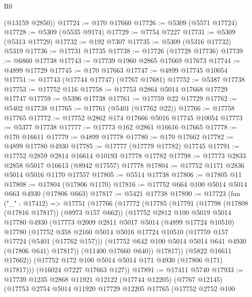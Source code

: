 \begin{lexlean}{R0}
\begin{coremodule}
      (@13159 @2850))
@17724 := @170 @17660
@17726 := @5309 (@5571 @17724)
@17728 := @5309 (@5535 @9174)
@17729 := @7754 @7227
@17731 := @5309 (@5313 @17729)
@17732 := @192 @7307
@17735 := @5309 (@5316 @17732) @5319
@17736 := @17731 @17735
@17738 := @17726 (@17728 @17736)
@17739 := @6860 @17738
@17743 := @17739 @1960 @2865 @17669 @17673
@17744 := @4899 @17729
@17745 := @170 @17663
@17747 := @4899 @17745 @10054
@17751 := @17743 (@17744 @17747) (@7767 @17681)
@17752 := @5387 @17738
@17753 := @17752 @116
@17758 := @17753 @2864 @5014 @17668 @17729 @17747
@17759 := @5396 @17738
@17761 := @17759 @22 @17729
@17762 := @5402 @17738
@17765 := @17761 (@5401 (@17762 @22))
@17766 := @17758 @17765
@17772 := @17752 @2862 @174 @17666 @5016 @17745 @10054
@17773 := @5377 @17738
@17777 := @17773 @162 @2861 @16616 @17665
@17778 := @170 @16611
@17779 := @4899 @17778
@17780 := @170 @17662
@17782 := @4899 @17780 @4930
@17785 := @17777 (@17779 @17782) @17745
@17791 := @17752 @2859 @2814 @16614 @10193 @17778 @17782
@17798 := @17773 @2833 @2858 @5017 @16613 (@8942 @17557) @17778
@17804 := @17752 @1171 @2836 @5014 @5016 @1170 @17557
@17805 := @5514 @17738
@17806 := @17805 @11
@17808 := @17804 (@17806 @1170)
@17816 := @17752 @664 @100 @5014 @5014 @663 @4930 (@17806 @663)
@17817 := @5421 @17738
@17890 := @17723
    (fun ("_" : @17412) =>
    @17751
      (@17766
        (@17772
          (@17785
            (@17791
              (@17798 (@17808 (@17816 @17817)) (@8973 @157 @662))
              (@17752
                @2812
                @100
                @5019
                @5014
                @17780
                @4930
                (@17773
                  @2009
                  @2811
                  @5017
                  @5014
                  (@4899 @17724 @10510)
                  @17780
                  (@17752
                    @358
                    @2160
                    @5014
                    @5016
                    @17724
                    @10510
                    (@17759 @157 @17724 (@5401 (@17762 @157)))
                    (@17752 @642 @100 @5014 @5014 @641 @4930 (@17806 @641) @17817))
                  (@11400 @17660 @640))
                @17817))
            (@5822 @16611 @17662))
          (@17752 @172 @100 @5014 @5014 @171 @4930 (@17806 @171) @17817)))
      (@16024 @7227 @17663 @127))
@17891 := @17411 @5740
@17933 := @17739
    @1235
    @2868
    @11921
    @12122
    (@17744 @12205)
    (@7767 @12145)
    (@17753
      @2754
      @5014
      @11920
      @17729
      @12205
      @17765
      (@17752
        @2752
        @100

\end{coremodule}
\end{lexlean}
